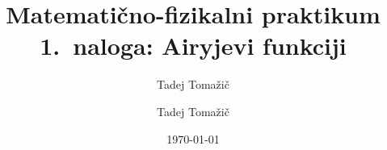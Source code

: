 \documentclass[12pt,a4paper]{article}
\title{
Matematično-fizikalni praktikum\\
\bigskip
\bf\Large 1.~naloga: Airyjevi funkciji
}
\author{Tadej Tomažič}
\begin{document}
\author{Tadej Tomažič}
\date{\today}

\maketitle

\newpage
{}
\tableofcontents
\listoffigures
\newpage


\end{document}
